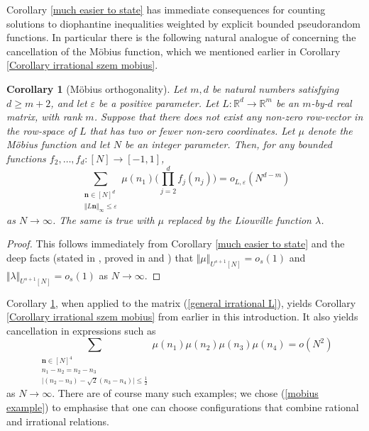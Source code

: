 \documentclass[12pt,a4paper,twoside,reqno]{amsart}
\newtheorem{Corollary}[Theorem]{Corollary}
\numberwithin{equation}{section}
\begin{document}
Corollary \ref{much easier to state} has immediate consequences for counting solutions to diophantine inequalities weighted by explicit bounded pseudorandom functions. In particular there is the following natural analogue of \cite[Proposition 9.1]{GT10} concerning the cancellation of the M\"{o}bius function, which we mentioned earlier in Corollary \ref{Corollary irrational szem mobius}.

\begin{Corollary}[M\"{o}bius orthogonality]
\label{Corollary Mobius}
Let $m,d$ be natural numbers satisfying $d\geqslant m+2$, and let $\varepsilon$ be a positive parameter. Let $L:\mathbb{R}^d \longrightarrow \mathbb{R}^m$ be an $m$-by-$d$ real matrix, with rank $m$. Suppose that there does not exist any non-zero row-vector in the row-space of $L$ that has two or fewer non-zero coordinates. Let $\mu$ denote the M\"{o}bius function and let $N$ be an integer parameter. Then, for any bounded functions $f_2,\dots,f_d:[N]\longrightarrow [-1,1]$, \[ \sum\limits_{ \substack{\mathbf{n} \in [N]^d\\ \Vert L\mathbf{n}\Vert_\infty \leqslant \varepsilon}} \mu(n_1) \Big(\prod\limits_{j=2}^d f_j(n_j)\Big)= o_{L,\varepsilon}(N^{d-m})\] as $N\rightarrow \infty$. The same is true with $\mu$ replaced by the Liouville function $\lambda$. 
\end{Corollary}
\begin{proof}
This follows immediately from Corollary \ref{much easier to state} and the deep facts (stated in \cite{GT10}, proved in \cite{GT12} and \cite{GTZ12}) that $\Vert \mu \Vert_{U^{s+1}[N]} = o_s(1)$ and $\Vert \lambda \Vert_{U^{s+1}[N]} = o_s(1)$ as $N\rightarrow \infty$.
\end{proof}


Corollary \ref{Corollary Mobius}, when applied to the matrix (\ref{general irrational L}), yields Corollary \ref{Corollary irrational szem mobius} from earlier in this introduction. It also yields cancellation in expressions such as 
\begin{equation}
\label{mobius example}\sum\limits_{\substack{\mathbf{n}\in [N]^4\\ n_1 - n_2 = n_2 - n_3\\ \vert (n_2 -n_3) - \sqrt {2}(n_3 - n_4)\vert \leqslant \frac{1}{2}}} \mu(n_1)\mu(n_2)\mu(n_3)\mu(n_4)  = o(N^2)
\end{equation} as $N\rightarrow \infty$. There are of course many such examples; we chose (\ref{mobius example}) to emphasise that one can choose configurations that combine rational and irrational relations.\\
\end{document}
